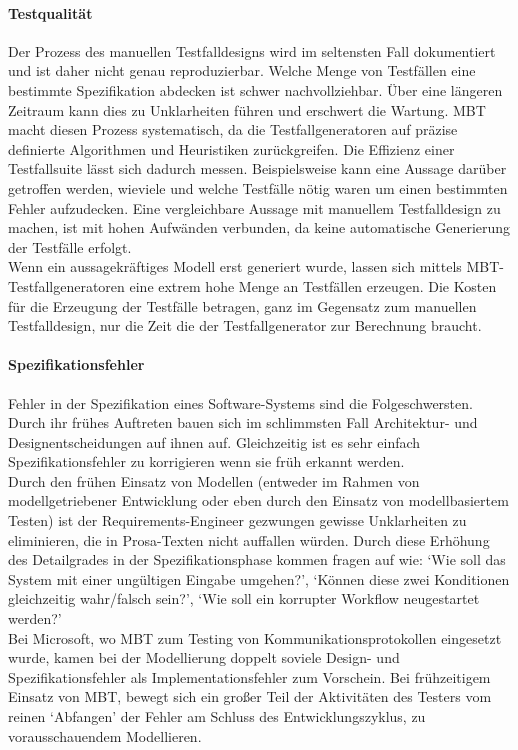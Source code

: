 \paragraph{Testqualität} Der Prozess des manuellen Testfalldesigns wird im seltensten Fall dokumentiert und ist daher nicht genau reproduzierbar. Welche Menge von Testfällen eine bestimmte Spezifikation abdecken ist schwer nachvollziehbar. Über eine längeren Zeitraum kann dies zu Unklarheiten führen und erschwert die Wartung.\cite{utting_practical_2007} MBT macht diesen Prozess systematisch, da die Testfallgeneratoren auf präzise definierte Algorithmen und Heuristiken zurückgreifen. Die Effizienz einer Testfallsuite lässt sich dadurch messen. Beispielsweise kann eine Aussage darüber getroffen werden, wieviele und welche Testfälle nötig waren um einen bestimmten Fehler aufzudecken. Eine vergleichbare Aussage mit manuellem Testfalldesign zu machen, ist mit hohen Aufwänden verbunden, da keine automatische Generierung der Testfälle erfolgt.\\
Wenn ein aussagekräftiges Modell erst generiert wurde, lassen sich mittels MBT-Testfallgeneratoren eine extrem hohe Menge an Testfällen erzeugen. Die Kosten für die Erzeugung der Testfälle betragen, ganz im Gegensatz zum manuellen Testfalldesign, nur die Zeit die der Testfallgenerator zur Berechnung braucht.

\paragraph{Spezifikationsfehler}
Fehler in der Spezifikation eines Software-Systems sind die Folgeschwersten. \cite{utting_practical_2007} Durch ihr frühes Auftreten bauen sich im schlimmsten Fall Architektur- und Designentscheidungen auf ihnen auf. Gleichzeitig ist es sehr einfach Spezifikationsfehler zu korrigieren wenn sie früh erkannt werden.\\
Durch den frühen Einsatz von Modellen (entweder im Rahmen von modellgetriebener Entwicklung oder eben durch den Einsatz von modellbasiertem Testen) ist der Requirements-Engineer gezwungen gewisse Unklarheiten zu eliminieren, die in Prosa-Texten nicht auffallen würden. Durch diese Erhöhung des Detailgrades in der Spezifikationsphase kommen fragen auf wie: `Wie soll das System mit einer ungültigen Eingabe umgehen?', `Können diese zwei Konditionen gleichzeitig wahr/falsch sein?', `Wie soll ein korrupter Workflow neugestartet werden?'\\
Bei Microsoft, wo MBT zum Testing von Kommunikationsprotokollen eingesetzt wurde, kamen bei der Modellierung doppelt soviele Design- und Spezifikationsfehler als Implementationsfehler zum Vorschein.\cite{stobie_model_2005} Bei frühzeitigem Einsatz von MBT, bewegt sich ein großer Teil der Aktivitäten des Testers vom reinen `Abfangen' der Fehler am Schluss des Entwicklungszyklus, zu vorausschauendem Modellieren.

